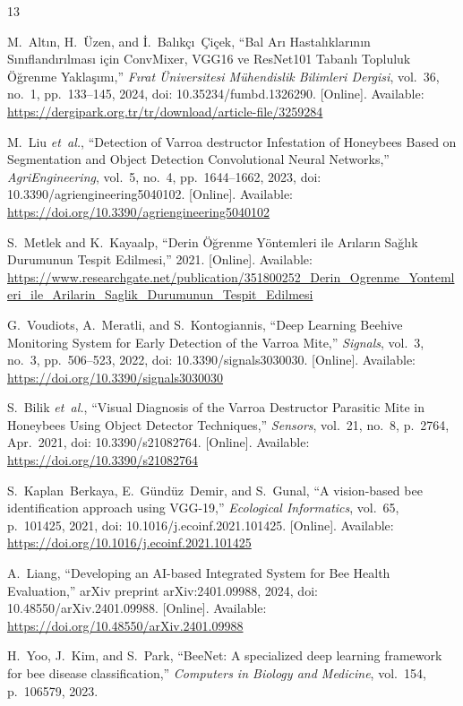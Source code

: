 \documentclass[conference]{IEEEtran}
\begin{document}
\begin{thebibliography}{13}

M.~Altın, H.~Üzen, and İ.~Balıkçı~Çiçek, ``Bal Arı Hastalıklarının Sınıflandırılması için ConvMixer, VGG16 ve ResNet101 Tabanlı Topluluk Öğrenme Yaklaşımı,'' \emph{Fırat Üniversitesi Mühendislik Bilimleri Dergisi}, vol.~36, no.~1, pp.~133--145, 2024, doi: 10.35234/fumbd.1326290. [Online]. Available: \url{https://dergipark.org.tr/tr/download/article-file/3259284}

M.~Liu \emph{et~al.}, ``Detection of Varroa destructor Infestation of Honeybees Based on Segmentation and Object Detection Convolutional Neural Networks,'' \emph{AgriEngineering}, vol.~5, no.~4, pp.~1644--1662, 2023, doi: 10.3390/agriengineering5040102. [Online]. Available: \url{https://doi.org/10.3390/agriengineering5040102}

S.~Metlek and K.~Kayaalp, ``Derin Öğrenme Yöntemleri ile Arıların Sağlık Durumunun Tespit Edilmesi,'' 2021. [Online]. Available: \url{https://www.researchgate.net/publication/351800252_Derin_Ogrenme_Yontemleri_ile_Arilarin_Saglik_Durumunun_Tespit_Edilmesi}

G.~Voudiots, A.~Meratli, and S.~Kontogiannis, ``Deep Learning Beehive Monitoring System for Early Detection of the Varroa Mite,'' \emph{Signals}, vol.~3, no.~3, pp.~506--523, 2022, doi: 10.3390/signals3030030. [Online]. Available: \url{https://doi.org/10.3390/signals3030030}

S.~Bilik \emph{et~al.}, ``Visual Diagnosis of the Varroa Destructor Parasitic Mite in Honeybees Using Object Detector Techniques,'' \emph{Sensors}, vol.~21, no.~8, p.~2764, Apr.~2021, doi: 10.3390/s21082764. [Online]. Available: \url{https://doi.org/10.3390/s21082764}

S.~Kaplan~Berkaya, E.~Gündüz~Demir, and S.~Gunal, ``A vision-based bee identification approach using VGG-19,'' \emph{Ecological Informatics}, vol.~65, p.~101425, 2021, doi: 10.1016/j.ecoinf.2021.101425. [Online]. Available: \url{https://doi.org/10.1016/j.ecoinf.2021.101425}

A.~Liang, ``Developing an AI-based Integrated System for Bee Health Evaluation,'' arXiv preprint arXiv:2401.09988, 2024, doi: 10.48550/arXiv.2401.09988. [Online]. Available: \url{https://doi.org/10.48550/arXiv.2401.09988}

H.~Yoo, J.~Kim, and S.~Park, ``BeeNet: A specialized deep learning framework for bee disease classification,'' \emph{Computers in Biology and Medicine}, vol.~154, p.~106579, 2023.


\end{thebibliography}
\end{document}
